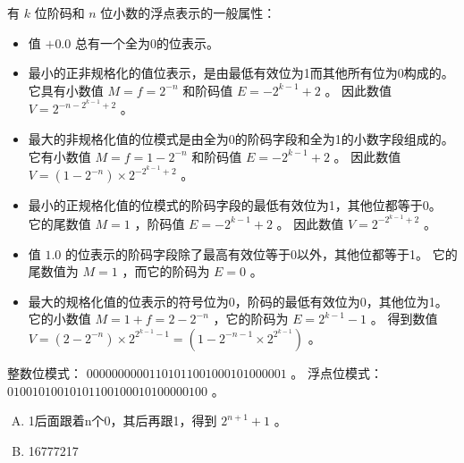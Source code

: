 {{        有 $k$ 位阶码和 $n$ 位小数的浮点表示的一般属性：

        \begin{itemize}
            \item 值 $+0.0$ 总有一个全为0的位表示。
            \item
            {
                最小的正非规格化的值位表示，是由最低有效位为1而其他所有位为0构成的。
                它具有小数值 $M = f = 2^{-n}$ 和阶码值 $E = -2^{k - 1} + 2$ 。
                因此数值 $V = 2^{-n - 2^{k - 1} + 2}$ 。
            }
            \item
            {
                最大的非规格化值的位模式是由全为0的阶码字段和全为1的小数字段组成的。
                它有小数值 $M = f = 1 - 2^{-n}$ 和阶码值 $E = -2^{k - 1} + 2$ 。
                因此数值 $V = (1 - 2^{-n}) \times 2^{-2^{k - 1} + 2}$ 。
            }
            \item
            {
                最小的正规格化值的位模式的阶码字段的最低有效位为1，其他位都等于0。
                它的尾数值 $M = 1$ ，阶码值 $E = -2^{k - 1} + 2$ 。
                因此数值 $V = 2^{-2^{k - 1} + 2}$ 。
            }
            \item
            {
                值 $1.0$ 的位表示的阶码字段除了最高有效位等于0以外，其他位都等于1。
                它的尾数值为 $M = 1$ ，而它的阶码为 $E = 0$ 。
            }
            \item
            {
                最大的规格化值的位表示的符号位为0，阶码的最低有效位为0，其他位为1。
                它的小数值 $M = 1 + f = 2 - 2^{-n}$ ，它的阶码为 $E = 2^{k - 1} - 1$ 。
                得到数值 $V = (2 - 2^{-n}) \times 2^{2^{k - 1} - 1} = (1 - 2^{-n - 1} \times 2^{2^{k - 1}})$ 。
            }
        \end{itemize}

        \begin{practicec}
            整数位模式： $00000000001 101011001000101000001$ 。
            浮点位模式： $ 0 10010100 10101100100010100000100$ 。
        \end{practicec}

        \begin{practicec}
            \begin{enumerate}[A.]
                \item 1后面跟着n个0，其后再跟1，得到 $2^{n + 1} + 1$ 。
                \item 16777217
            \end{enumerate}
        \end{practicec}
    }

}
